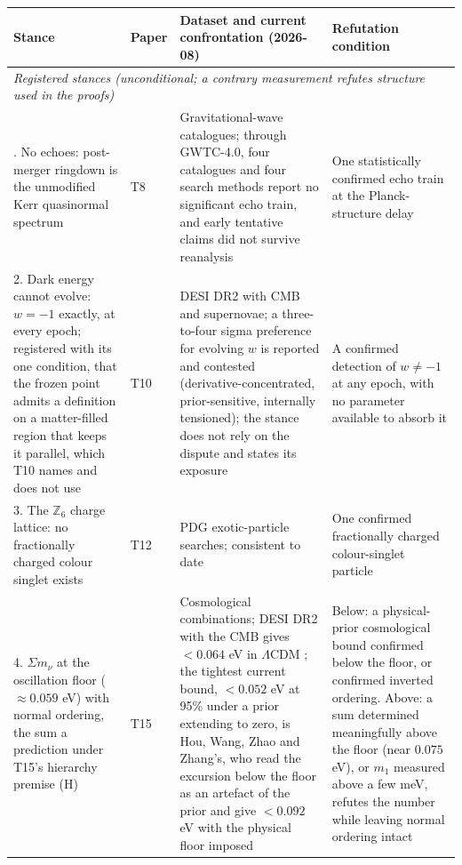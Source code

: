 \documentclass[11pt]{article}
\theoremstyle{definition}
\newcommand{\Z}{\mathbb{Z}}
\newcommand{\mnu}{\Sigma m_{\nu}}
\begin{document}
\begingroup\small
\begin{longtable}{p{} p{} p{} p{}}
\toprule
\textbf{Stance} & \textbf{Paper} & \textbf{Dataset and current confrontation (2026-08)} & \textbf{Refutation condition} \\
\midrule
\endhead
\multicolumn{4}{l}{\emph{Registered stances (unconditional; a contrary measurement refutes structure used in the proofs)}}\\
\addlinespace[2pt]
1. No echoes: post-merger ringdown is the unmodified Kerr quasinormal spectrum & T8 & Gravitational-wave catalogues; through GWTC-4.0, four catalogues and four search methods report no significant echo train, and early tentative claims did not survive reanalysis \cite{GWTC4} & One statistically confirmed echo train at the Planck-structure delay \\
2. Dark energy cannot evolve: $w = -1$ exactly, at every epoch; registered with its one condition, that the frozen point admits a definition on a matter-filled region that keeps it parallel, which T10 names and does not use & T10 & DESI DR2 with CMB and supernovae; a three-to-four sigma preference for evolving $w$ is reported and contested (derivative-concentrated, prior-sensitive, internally tensioned); the stance does not rely on the dispute and states its exposure \cite{DESIDR2} & A confirmed detection of $w \neq -1$ at any epoch, with no parameter available to absorb it \\
3. The $\Z_{6}$ charge lattice: no fractionally charged colour singlet exists & T12 & PDG exotic-particle searches; consistent to date \cite{PDG} & One confirmed fractionally charged colour-singlet particle \\
4. $\mnu$ at the oscillation floor ($\approx 0.059$ eV) with normal ordering, the sum a prediction under T15's hierarchy premise (H) & T15 & Cosmological combinations; DESI DR2 with the CMB gives $< 0.064$ eV in $\Lambda$CDM \cite{DESIDR2}; the tightest current bound, $< 0.052$ eV at 95\% under a prior extending to zero, is Hou, Wang, Zhao and Zhang's, who read the excursion below the floor as an artefact of the prior and give $< 0.092$ eV with the physical floor imposed \cite{HouWangZhaoZhang2026} & Below: a physical-prior cosmological bound confirmed below the floor, or confirmed inverted ordering. Above: a sum determined meaningfully above the floor (near $0.075$ eV), or $m_{1}$ measured above a few meV, refutes the number while leaving normal ordering intact \\

\end{longtable}
\end{document}
